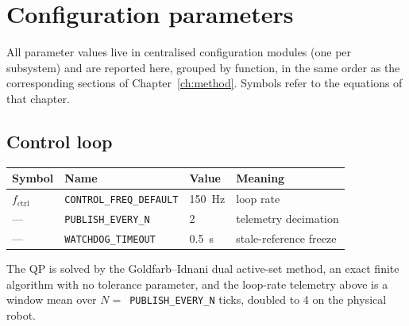 \chapter{Configuration parameters}
\label{app:config}


All parameter values live in centralised configuration modules (one per subsystem) and are reported here, grouped by function, in the same order as the corresponding sections of Chapter~\ref{ch:method}. Symbols refer to the equations of that chapter.

\begingroup\footnotesize

\section{Control loop}
\begin{tabularx}{\linewidth}{@{}l>{\scriptsize}ll>{\raggedright\arraybackslash}X@{}}
\toprule
Symbol & Name & Value & Meaning \\
\midrule
$f_{\text{ctrl}}$ & \texttt{CONTROL\_FREQ\_DEFAULT} & 150~Hz & loop rate \\
--- & \texttt{PUBLISH\_EVERY\_N} & 2 & telemetry decimation \\
--- & \texttt{WATCHDOG\_TIMEOUT} & 0.5~s & stale-reference freeze \\
\bottomrule
\end{tabularx}

The QP is solved by the Goldfarb--Idnani dual active-set method, an exact finite algorithm with no tolerance parameter, and the loop-rate telemetry above is a window mean over $N = $~\texttt{PUBLISH\_EVERY\_N} ticks, doubled to 4 on the physical robot.

